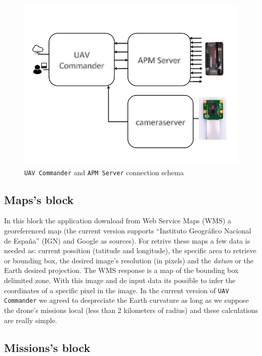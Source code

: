 \documentclass{llncs}
\begin{document}
\begin{figure}[H]
  \centering
  \includegraphics[scale=0.60]{img/arquitectura.jpg}
  \caption{\texttt{UAV Commander} and \texttt{APM Server} connection schema}
  \label{fig:uavc_ppal}
\end{figure}

\subsection{Maps's block}
\label{maps_block}

In this block the application download from Web Service Maps (WMS) a georeferenced map (the current version supports ``Instituto Geográfico Nacional de España'' (IGN) and Google as sources). For retrive these maps a few data is needed as: current possition (tatitude and longitude), the specific area to retrieve or bounding box, the desired image's resolution (in pixels) and the \textit{datum} or the Earth desired projection.
The WMS response is a map of the bounding box delimited zone. With this image and de input data its possible to infer the coordinates of a specific pixel in the image. In the current version of \texttt{UAV Commander} we agreed to despreciate the Earth curvature as long as we suppose the drone's missions local (less than 2 kilometers of radius) and these calculations are really simple.

\subsection{Missions's block}
\label{missions_block}
\end{document}
